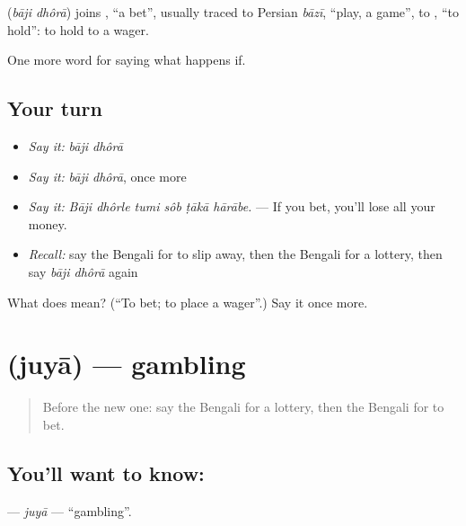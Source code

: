 \begin{cousinweb}
\textbf{ } (\emph{bāji dhôrā}) joins , \textquotedblleft{}a bet\textquotedblright{}, usually traced to Persian \emph{bāzī}, \textquotedblleft{}play, a game\textquotedblright{}, to , \textquotedblleft{}to hold\textquotedblright{}: to hold to a wager.
\end{cousinweb}

\begin{grammarlens}[title={What you've built}]
One more word for saying what happens if.
\end{grammarlens}

\subsection*{Your turn}
\begin{itemize}
\raggedright
  \item \emph{Say it:} \emph{bāji dhôrā}
  \item \emph{Say it:} \emph{bāji dhôrā}, once more
  \item \emph{Say it:} \emph{Bāji dhôrle tumi sôb ṭākā hārābe.} — If you bet, you'll lose all your money.
  \item \emph{Recall:} say the Bengali for to slip away, then the Bengali for a lottery, then say \emph{bāji dhôrā} again
\end{itemize}

\begin{tcolorbox}[breakable,colback=teal!4,colframe=teal!35!black,title={Before you move on}]
What does   mean? (\textquotedblleft{}To bet; to place a wager\textquotedblright{}.) Say it once more.
\end{tcolorbox}
\section[\texorpdfstring{\bn{জুয়া} (juyā)}{জুয়া (juyā)}]{ (juyā) — gambling}

\label{lesson:BN-C534-juya}



\begin{quote}
Before the new one: say the Bengali for a lottery, then the Bengali for to bet.
\end{quote}

\subsection*{You'll want to know: }
\textbf{} — \emph{juyā} — \textquotedblleft{}gambling\textquotedblright{}.

